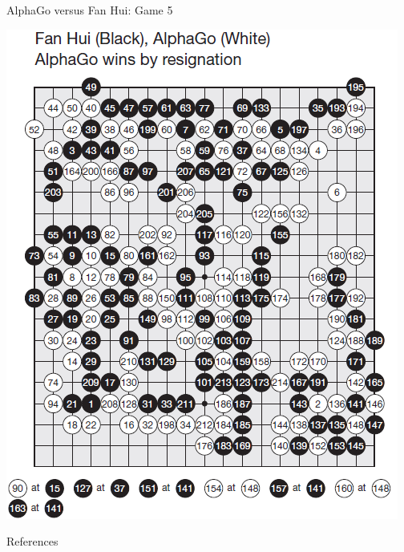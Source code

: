 \documentclass{beamer}
\begin{document}
{    \begin{frame}{AlphaGo versus Fan Hui: Game 5}
      \begin{center}
        \includegraphics[height=.9\textheight]{../img/AlphaGo_vs_Fan_Hui_Game_5.png}
      \end{center}
    \end{frame}
  }

  \begin{frame}[allowframebreaks]{References}
    \tiny
    \printbibliography[heading=none]
  \end{frame}
\end{document}
